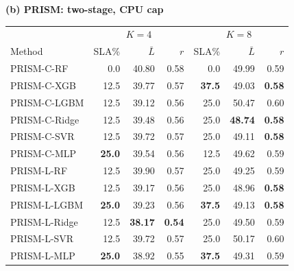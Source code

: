 \begin{minipage}[t]{.485\textwidth}\centering\textbf{(b) PRISM: two-stage, CPU cap}\par\smallskip
\begin{tabular*}{\linewidth}{@{\extracolsep{\fill}}lrrrrrr@{}}
\toprule
 & \multicolumn{3}{c}{\mbox{$K=4$}} & \multicolumn{3}{c}{\mbox{$K=8$}}\\
\mbox{Method} & \mbox{SLA\%} & \mbox{$\bar L$} & \mbox{$r$} & \mbox{SLA\%} & \mbox{$\bar L$} & \mbox{$r$}\\\midrule
PRISM-C-RF & 0.0 & 40.80 & 0.58 & 0.0 & 49.99 & 0.59\\
PRISM-C-XGB & 12.5 & 39.77 & 0.57 & \textbf{37.5} & 49.03 & \textbf{0.58}\\
PRISM-C-LGBM & 12.5 & 39.12 & 0.56 & 25.0 & 50.47 & 0.60\\
PRISM-C-Ridge & 12.5 & 39.48 & 0.56 & 25.0 & \textbf{48.74} & \textbf{0.58}\\
PRISM-C-SVR & 12.5 & 39.72 & 0.57 & 25.0 & 49.11 & \textbf{0.58}\\
PRISM-C-MLP & \textbf{25.0} & 39.54 & 0.56 & 12.5 & 49.62 & 0.59\\
PRISM-L-RF & 12.5 & 39.90 & 0.57 & 25.0 & 49.25 & 0.59\\
PRISM-L-XGB & 12.5 & 39.17 & 0.56 & 25.0 & 48.96 & \textbf{0.58}\\
PRISM-L-LGBM & \textbf{25.0} & 39.23 & 0.56 & \textbf{37.5} & 49.13 & \textbf{0.58}\\
PRISM-L-Ridge & 12.5 & \textbf{38.17} & \textbf{0.54} & 25.0 & 49.50 & 0.59\\
PRISM-L-SVR & 12.5 & 39.72 & 0.57 & 25.0 & 50.17 & 0.60\\
PRISM-L-MLP & \textbf{25.0} & 38.92 & 0.55 & \textbf{37.5} & 49.31 & 0.59\\
\bottomrule\end{tabular*}\end{minipage}
